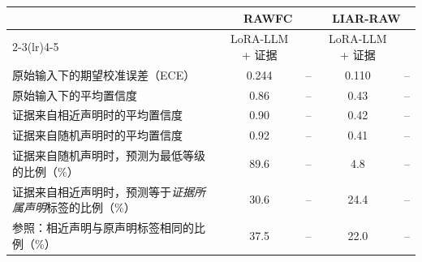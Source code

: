 \begin{tabular}{lcccc}
\toprule
 & \multicolumn{2}{c}{RAWFC} & \multicolumn{2}{c}{LIAR-RAW} \\
\cmidrule(lr){2-3}\cmidrule(lr){4-5}
 & LoRA-LLM + 证据 & \ours{} & LoRA-LLM + 证据 & \ours{} \\
\midrule
原始输入下的期望校准误差（ECE） & 0.244 & -- & 0.110 & -- \\
原始输入下的平均置信度 & 0.86 & -- & 0.43 & -- \\
证据来自相近声明时的平均置信度 & 0.90 & -- & 0.42 & -- \\
证据来自随机声明时的平均置信度 & 0.92 & -- & 0.41 & -- \\
证据来自随机声明时，预测为最低等级的比例（\%） & 89.6 & -- & 4.8 & -- \\
证据来自相近声明时，预测等于\emph{证据所属声明}标签的比例（\%） & 30.6 & -- & 24.4 & -- \\
参照：相近声明与原声明标签相同的比例（\%） & 37.5 & -- & 22.0 & -- \\
\bottomrule
\end{tabular}
